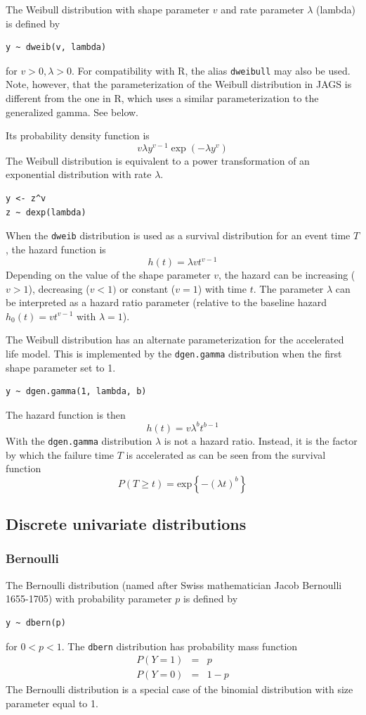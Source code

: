 \documentclass[11pt, a4paper, titlepage]{report}
\newcommand{\R}{\textsf{R}}
\begin{document}
{The Weibull distribution with shape parameter $v$ and rate parameter
$\lambda$ (lambda) is defined by
\begin{verbatim}
y ~ dweib(v, lambda)
\end{verbatim}
for $v > 0, \lambda > 0$. For compatibility with \R, the alias
\texttt{dweibull} may also be used. Note, however, that the
parameterization of the Weibull distribution in JAGS is different from
the one in \R, which uses a similar parameterization to the
generalized gamma. See below.

Its probability density function is
\[
v  \lambda  y^{v - 1} \exp (- \lambda y^v)
\]
The Weibull distribution is equivalent to a power transformation of
an exponential distribution with rate $\lambda$.
\begin{verbatim}
y <- z^v
z ~ dexp(lambda)
\end{verbatim}

When the \texttt{dweib} distribution is used as a survival
distribution for an event time $T$, the hazard function is
\[
h(t) = \lambda v t^{v-1}
\]
Depending on the value of the shape parameter $v$, the hazard can be
increasing ($v > 1$), decreasing ($v < 1)$ or constant ($v=1$) with
time $t$. The parameter $\lambda$ can be interpreted as a hazard ratio
parameter (relative to the baseline hazard $h_0(t) = v t^{v-1}$ with
$\lambda=1$).

The Weibull distribution has an alternate parameterization for the
accelerated life model. This is implemented by the \texttt{dgen.gamma}
distribution when the first shape parameter set to 1.
\begin{verbatim}
y ~ dgen.gamma(1, lambda, b)
\end{verbatim}
The hazard function is then
\[
h(t) = v \lambda^b t^{b-1}
\]
With the \texttt{dgen.gamma} distribution $\lambda$ is not a hazard
ratio. Instead, it is the factor by which the failure time $T$ is
accelerated as can be seen from the survival function
\[
P(T \geq t) = \mbox{exp}\left\{ - \left(\lambda t \right)^b \right\}
\]

\subsection{Discrete univariate distributions}

\subsubsection{Bernoulli}

The Bernoulli distribution (named after Swiss mathematician Jacob
Bernoulli 1655-1705) with probability parameter $p$ is defined by
\begin{verbatim}
y ~ dbern(p)
\end{verbatim}
for $0 < p < 1$. The \texttt{dbern} distribution has probability mass function
\begin{eqnarray*}
  P(Y=1) & = & p \\
  P(Y=0) & = & 1 - p
\end{eqnarray*}
The Bernoulli distribution is a special case of the binomial distribution
with size parameter equal to 1.

}
\end{document}
